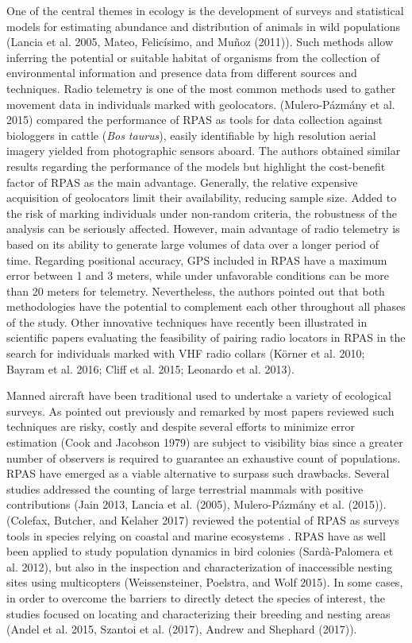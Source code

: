 \documentclass[]{interact}
\theoremstyle{plain}%
\theoremstyle{definition}
\theoremstyle{remark}
\begin{document}
One of the central themes in ecology is the development of surveys and
statistical models for estimating abundance and distribution of animals
in wild populations (Lancia et al. 2005, Mateo, Felicísimo, and Muñoz
(2011)). Such methods allow inferring the potential or suitable habitat
of organisms from the collection of environmental information and
presence data from different sources and techniques. Radio telemetry is
one of the most common methods used to gather movement data in
individuals marked with geolocators. (Mulero-Pázmány et al. 2015)
compared the performance of RPAS as tools for data collection against
biologgers in cattle (\emph{Bos taurus}), easily identifiable by high
resolution aerial imagery yielded from photographic sensors aboard. The
authors obtained similar results regarding the performance of the models
but highlight the cost-benefit factor of RPAS as the main advantage.
Generally, the relative expensive acquisition of geolocators limit their
availability, reducing sample size. Added to the risk of marking
individuals under non-random criteria, the robustness of the analysis
can be seriously affected. However, main advantage of radio telemetry is
based on its ability to generate large volumes of data over a longer
period of time. Regarding positional accuracy, GPS included in RPAS have
a maximum error between 1 and 3 meters, while under unfavorable
conditions can be more than 20 meters for telemetry. Nevertheless, the
authors pointed out that both methodologies have the potential to
complement each other throughout all phases of the study. Other
innovative techniques have recently been illustrated in scientific
papers evaluating the feasibility of pairing radio locators in RPAS in
the search for individuals marked with VHF radio collars (Körner et al.
2010; Bayram et al. 2016; Cliff et al. 2015; Leonardo et al. 2013).

Manned aircraft have been traditional used to undertake a variety of
ecological surveys. As pointed out previously and remarked by most
papers reviewed such techniques are risky, costly and despite several
efforts to minimize error estimation (Cook and Jacobson 1979) are
subject to visibility bias since a greater number of observers is
required to guarantee an exhaustive count of populations. RPAS have
emerged as a viable alternative to surpass such drawbacks. Several
studies addressed the counting of large terrestrial mammals with
positive contributions (Jain 2013, Lancia et al. (2005), Mulero-Pázmány
et al. (2015)). (Colefax, Butcher, and Kelaher 2017) reviewed the
potential of RPAS as surveys tools in species relying on coastal and
marine ecosystems . RPAS have as well been applied to study population
dynamics in bird colonies (Sardà-Palomera et al. 2012), but also in the
inspection and characterization of inaccessible nesting sites using
multicopters (Weissensteiner, Poelstra, and Wolf 2015). In some cases,
in order to overcome the barriers to directly detect the species of
interest, the studies focused on locating and characterizing their
breeding and nesting areas (Andel et al. 2015, Szantoi et al. (2017),
Andrew and Shephard (2017)).
\end{document}
